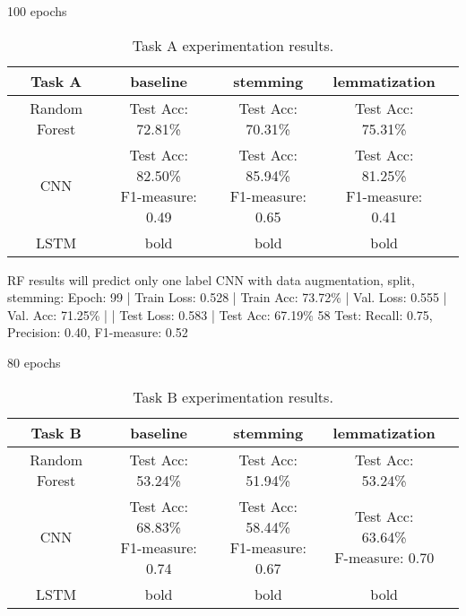\documentclass[11pt,a4paper]{article}
\begin{document}
100 epochs

\begin{table*}[t]
\begin{center}
\begin{tabular}{|c|cccc|}
\hline \bf Task A & \bf baseline & \bf stemming & \bf lemmatization & \\ \hline
Random Forest & Test Acc: 72.81\% & Test Acc: 70.31\% & Test Acc: 75.31\% & \\ \hline
CNN & \shortstack{Test Acc: 82.50\% \\ F1-measure: 0.49}  & \shortstack{Test Acc: 85.94\% \\ F1-measure: 0.65} & \shortstack{Test Acc: 81.25\% \\ F1-measure: 0.41} & \\ \hline
LSTM & bold & bold & bold & \\
\hline
\end{tabular}
\end{center}
\caption{\label{font-table} Task A experimentation results. }
\end{table*}

RF results will predict only one label
CNN with data augmentation, split, stemming:
 Epoch: 99 | Train Loss: 0.528 | Train Acc: 73.72\% | Val. Loss: 0.555 | Val. Acc: 71.25\% |
| Test Loss: 0.583 | Test Acc: 67.19\%
58
Test: Recall: 0.75, Precision: 0.40, F1-measure: 0.52

80 epochs

\begin{table*}[t]
\begin{center}
\begin{tabular}{|c|cccc|}
\hline \bf Task B & \bf baseline & \bf stemming & \bf lemmatization & \\ \hline
Random Forest & Test Acc: 53.24\% & Test Acc: 51.94\% & Test Acc: 53.24\% & \\ \hline
CNN & \shortstack{Test Acc: 68.83\% \\ F1-measure: 0.74}  & \shortstack{Test Acc: 58.44\% \\ F1-measure: 0.67} & \shortstack{Test Acc: 63.64\% \\ F-measure: 0.70} & \\ \hline
LSTM & bold & bold & bold & \\
\hline
\end{tabular}
\end{center}
\caption{\label{font-table} Task B experimentation results.}
\end{table*}
\end{document}
